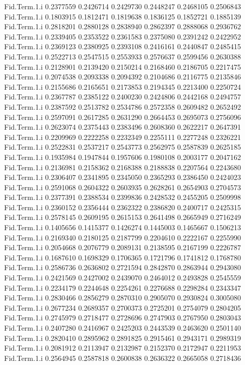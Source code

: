 \documentclass[11pt]{article} %
\begin{document}
\begin{Schunk}
\begin{Soutput}
Fid.Term.1.i 0.2377559 0.2426714 0.2429730 0.2448247 0.2468105 0.2506843
Fid.Term.1.i 0.1803915 0.1812471 0.1819638 0.1836125 0.1852721 0.1885139
Fid.Term.1.i 0.2818201 0.2880128 0.2838940 0.2862397 0.2888068 0.2936762
Fid.Term.1.i 0.2339405 0.2353522 0.2361583 0.2375080 0.2391242 0.2422952
Fid.Term.1.i 0.2369123 0.2380925 0.2393108 0.2416161 0.2440847 0.2485415
Fid.Term.1.i 0.2522713 0.2547515 0.2553933 0.2576637 0.2599456 0.2630388
Fid.Term.1.i 0.2128901 0.2139420 0.2150214 0.2168460 0.2186705 0.2217475
Fid.Term.1.i 0.2074538 0.2093338 0.2094392 0.2104686 0.2116775 0.2135846
Fid.Term.1.i 0.2155686 0.2165651 0.2173853 0.2194345 0.2213400 0.2250724
Fid.Term.1.i 0.2367787 0.2385122 0.2400230 0.2424806 0.2442168 0.2494757
Fid.Term.1.i 0.2387592 0.2513782 0.2534786 0.2572358 0.2609482 0.2652492
Fid.Term.1.i 0.2597091 0.2617285 0.2631290 0.2664453 0.2695073 0.2756096
Fid.Term.1.i 0.2623074 0.2375443 0.2383496 0.2608360 0.2622217 0.2647391
Fid.Term.1.i 0.2209969 0.2222258 0.2232349 0.2255111 0.2277248 0.2326221
Fid.Term.1.i 0.2522831 0.2537217 0.2543773 0.2562975 0.2587839 0.2625185
Fid.Term.1.i 0.1935984 0.1947844 0.1957606 0.1980108 0.2003177 0.2047162
Fid.Term.1.i 0.2136981 0.2158362 0.2168388 0.2188838 0.2207564 0.2243680
Fid.Term.1.i 0.2306407 0.2341895 0.2345050 0.2365293 0.2386450 0.2424023
Fid.Term.1.i 0.2591068 0.2604322 0.2603935 0.2628261 0.2654903 0.2704573
Fid.Term.1.i 0.2377391 0.2388534 0.2399836 0.2428532 0.2455205 0.2509998
Fid.Term.1.i 0.2360152 0.2356444 0.2362322 0.2386820 0.2400717 0.2425315
Fid.Term.1.i 0.2578145 0.2609195 0.2615153 0.2641498 0.2665949 0.2716249
Fid.Term.1.i 0.1405656 0.1415377 0.1426274 0.1445003 0.1465667 0.1506213
Fid.Term.1.i 0.2169340 0.2180125 0.2187799 0.2204610 0.2222167 0.2255990
Fid.Term.1.i 0.2054668 0.2076779 0.2089131 0.2138595 0.2167199 0.2226787
Fid.Term.1.i 0.1687610 0.1698329 0.1706365 0.1721796 0.1741812 0.1768780
Fid.Term.1.i 0.2586736 0.2636802 0.2721594 0.2842870 0.2863944 0.2943080
Fid.Term.1.i 0.2421569 0.2427002 0.2439070 0.2464012 0.2493828 0.2545559
Fid.Term.1.i 0.2234179 0.2244648 0.2254261 0.2276688 0.2298284 0.2343347
Fid.Term.1.i 0.2830466 0.2856279 0.2870310 0.2905070 0.2930824 0.3005080
Fid.Term.1.i 0.2677234 0.2689357 0.2700373 0.2725201 0.2754079 0.2804205
Fid.Term.1.i 0.2745979 0.2718477 0.2728696 0.2747903 0.2767950 0.2803043
Fid.Term.1.i 0.2407280 0.2416967 0.2425203 0.2443539 0.2463620 0.2501140
Fid.Term.1.i 0.2820410 0.2895962 0.2891825 0.2915461 0.2943171 0.2989319
Fid.Term.1.i 0.2081912 0.2113947 0.2132987 0.2152370 0.2172947 0.2211953
Fid.Term.1.i 0.2564945 0.2587818 0.2600838 0.2636322 0.2665058 0.2718436

\end{Soutput}
\end{Schunk}
\end{document}
